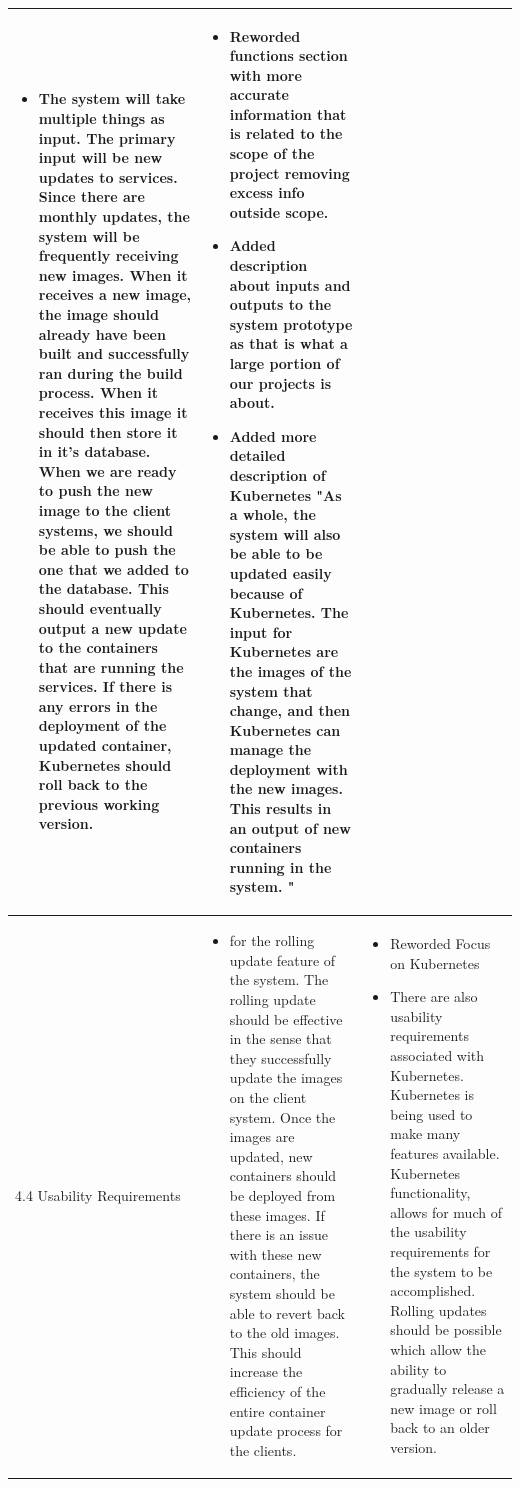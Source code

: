 \documentclass[onecolumn, draftclsnofoot,10pt, compsoc]{IEEEtran}
\begin{document}
\begin{longtable}{ | m{8em} | m{24em}| m{16em}| }
\begin{itemize}
    \item The system will take multiple things as input. The primary input will be new updates to services. Since there are monthly updates, the system will be frequently receiving new images. When it receives a new image, the image should already have been built and successfully ran during the build process. When it receives this image it should then store it in it’s database. When we are ready to push the new image to the client systems, we should be able to push the one that we added to the database. This should eventually output a new update to the containers that are running the services. If there is any errors in the deployment of the updated container, Kubernetes should roll back to the previous working version.

\end{itemize}&
\begin{itemize}  
\item Reworded functions section with more accurate information that is related to the scope of the project removing excess info outside scope.

\item Added description about inputs and outputs to the system prototype as that is what a large portion of our projects is about.

  \item Added more detailed description of Kubernetes "As a whole, the system will also be able to be updated easily because of Kubernetes. The input for Kubernetes are the images of the system that change, and then Kubernetes can manage the deployment with the new images. This results in an output of new containers running in the system. "
\end{itemize}
\\
\hline
4.4 Usability Requirements&
\begin{itemize}
  \item for the rolling update feature of the system. The rolling update should be effective in the sense that they successfully update the images on the client system. Once the images are updated, new containers should be deployed from these images. If there is an issue with these new containers, the system should be able to revert back to the old images. This should increase the efficiency of the entire container update process for the clients. 

\end{itemize}&
\begin{itemize}
  \item Reworded Focus on Kubernetes
  \item There are also usability requirements associated with Kubernetes. Kubernetes is being used to make many features available. Kubernetes functionality, allows for much of the usability requirements for the system to be accomplished. Rolling updates should be possible which allow the ability to gradually release a new image or roll back to an older version.



\end{itemize}
\end{longtable}
\end{document}
